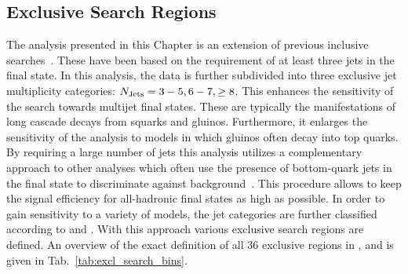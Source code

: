 \subsection{Exclusive Search Regions}
\label{subsec:RA2_search_regions}
The analysis presented in this Chapter is an extension of previous inclusive searches~\cite{springerlink:10.1007/JHEP08(2011)155, Chatrchyan:2012lia}. These have been based on the requirement of at least three jets in the final state. In this analysis, the data is further subdivided into three exclusive jet multiplicity categories: $N_{\text{Jets}} = 3 - 5, 6 - 7, \ge 8$. This enhances the sensitivity of the search towards multijet final states. These are typically the manifestations of long cascade decays from squarks and gluinos. Furthermore, it enlarges the sensitivity of the analysis to models in which gluinos often decay into top quarks. By requiring a large number of jets this analysis utilizes a complementary approach to other analyses which often use the presence of bottom-quark jets in the final state to discriminate against background~\cite{Chatrchyan:2013lya, Chatrchyan:2013wxa, CMS-PAS-SUS-13-019, CMS-PAS-SUS-14-011}. This procedure allows to keep the signal efficiency for all-hadronic final states as high as possible. In order to gain sensitivity to a variety of models, the jet categories are further classified according to \HT and \MHT. With this approach various exclusive search regions are defined. An overview of the exact definition of all 36 exclusive regions in \NJets, \HT and \MHT is given in Tab.~\ref{tab:excl_search_bins}.

